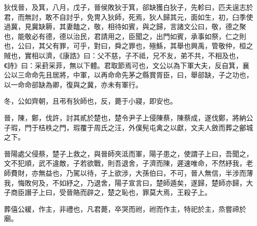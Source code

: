 \begin{pinyinscope}
狄伐晉，及箕，八月，戊子，晉侯敗狄于箕，郤缺獲白狄子，先軫曰，匹夫逞志於君，而無討，敢不自討乎，免冑入狄師，死焉，狄人歸其元，面如生，初，臼季使過冀，見冀缺耨，其妻饁之，敬，相待如賓，與之歸，言諸文公曰，敬，德之聚也，能敬必有德，德以治民，君請用之，臣聞之，出門如賓，承事如祭，仁之則也，公曰，其父有罪，可乎，對曰，舜之罪也，殛鯀，其舉也興禹，管敬仲，桓之賊也，實相以濟，《康誥》曰：父不慈，子不祗，兄不友，弟不共，不相及也，《詩》曰：采葑采菲，無以下體。君取節焉可也，文公以為下軍大夫，反自箕，襄公以三命命先且居將，中軍，以再命命先茅之縣賞胥臣，曰，舉郤缺，子之功也，以一命命郤缺為卿，復與之冀，亦未有軍行。

冬，公如齊朝，且弔有狄師也，反，薨于小寢，即安也。

晉，陳，鄭，伐許，討其貳於楚也，楚令尹子上侵陳蔡，陳蔡成，遂伐鄭，將納公子瑕，門于桔柣之門，瑕覆于周氏之汪，外僕髡屯禽之以獻，文夫人斂而葬之鄶城之下。

晉陽處父侵蔡，楚子上救之，與晉師夾泜而軍，陽子患之，使謂子上曰，吾聞之，文不犯順，武不違敵，子若欲戰，則吾退舍，子濟而陳，遲速唯命，不然紓我，老師費財，亦無益也，乃駕以待，子上欲涉，大孫伯曰，不可，晉人無信，半涉而薄我，悔敗何及，不如紓之，乃退舍，陽子宣言曰，楚師遁矣，遂歸，楚師亦歸，大子商臣譖子上曰，受晉賂而辟之，楚之恥也，罪莫大焉，王殺子上。

葬僖公緩，作主，非禮也，凡君薨，卒哭而祔，祔而作主，特祀於主，烝嘗禘於廟。


\end{pinyinscope}